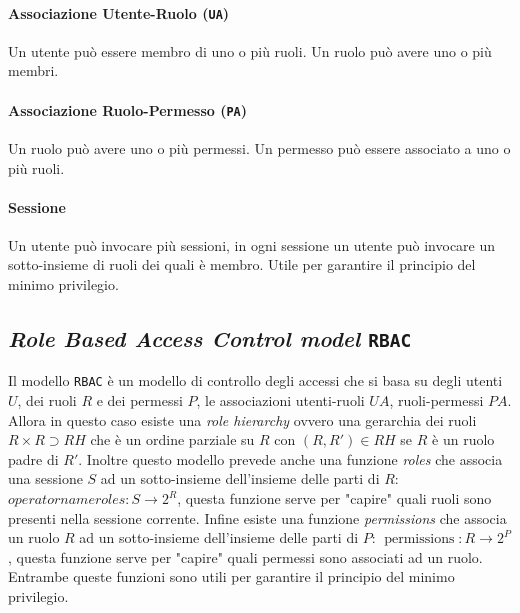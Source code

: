             \paragraph{Associazione Utente-Ruolo (\texttt{UA})} Un utente può essere membro di uno o più ruoli. Un ruolo può avere uno o più membri.
            \paragraph{Associazione Ruolo-Permesso (\texttt{PA})} Un ruolo può avere uno o più permessi. Un permesso può essere associato a uno o più ruoli.
            \paragraph{Sessione} Un utente può invocare più sessioni, in ogni sessione un utente può invocare un sotto-insieme di ruoli dei quali è membro. Utile per garantire il principio del minimo privilegio.
    \subsection{\textit{Role Based Access Control model} \texttt{RBAC}}
        \label{subsec:RBAC}
        Il modello \texttt{RBAC} è un modello di controllo degli accessi che si basa su degli utenti $U$, dei ruoli $R$ e dei permessi $P$, le associazioni utenti-ruoli $UA$, ruoli-permessi $PA$. Allora in questo caso esiste una \textit{role hierarchy} ovvero una gerarchia dei ruoli $R\times R\supset RH$ che è un ordine parziale su $R$ con $(R,R')\in RH$ se $R$ è un ruolo padre di $R'$. Inoltre questo modello prevede anche una funzione \textit{roles} che associa una sessione $S$ ad un sotto-insieme dell'insieme delle parti di $R$: $operatorname{roles}: S \rightarrow 2^R$, questa funzione serve per "capire" quali ruoli sono presenti nella sessione corrente. Infine esiste una funzione \textit{permissions} che associa un ruolo $R$ ad un sotto-insieme dell'insieme delle parti di $P$: $\operatorname{permissions}: R \rightarrow 2^P$, questa funzione serve per "capire" quali permessi sono associati ad un ruolo. Entrambe queste funzioni sono utili per garantire il principio del minimo privilegio.
